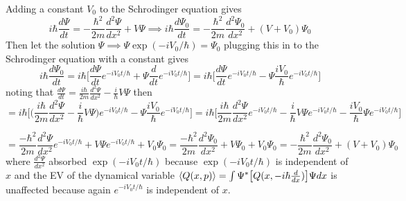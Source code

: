 \documentclass[12pt]{exam}
\begin{document}
\begin{solution}
    Adding a constant $V_0$ to the Schrodinger equation gives 
    $$i\hbar\frac{d\Psi}{dt} = -\frac{\hbar^2}{2m}\frac{d^2\Psi}{dx^2}+V\Psi \implies i\hbar\frac{d\Psi_0}{dt} = -\frac{\hbar^2}{2m}\frac{d^2\Psi_0}{dx^2}+(V+V_0)\Psi_0$$
    Then let the solution $\Psi \implies \Psi \exp(-iV_0/\hbar) = \Psi_0$ plugging this in to the Schrodinger equation with a constant gives
    $$i\hbar\frac{d\Psi_0}{dt}=i\hbar\bigg[\frac{d\Psi}{dt}e^{-iV_0t/\hbar} + \Psi \frac{d}{dt}e^{-iV_0t/\hbar}\bigg] = i\hbar\bigg[\frac{d\Psi}{dt}e^{-iV_0t/\hbar} - \Psi \frac{iV_0}{\hbar}e^{-iV_0t/\hbar}\bigg]$$
    noting that $\frac{d\Psi}{dt} = \frac{i\hbar}{2m}\frac{d^2\Psi}{dx^2} - \frac{i}{\hbar}V\Psi$ then 
    $$= i\hbar\bigg[\big(\frac{i\hbar}{2m}\frac{d^2\Psi}{dx^2} - \frac{i}{\hbar}V\Psi \big)e^{-iV_0t/\hbar} - \Psi \frac{iV_0}{\hbar}e^{-iV_0t/\hbar}\bigg]  = 
    i\hbar\bigg[\frac{i\hbar}{2m}\frac{d^2\Psi}{dx^2}e^{-iV_0t/\hbar} - \frac{i}{\hbar}V\Psi e^{-iV_0t/\hbar} -\frac{iV_0}{\hbar} \Psi e^{-iV_0t/\hbar}\bigg] $$

    $$= 
    \frac{-\hbar^2}{2m}\frac{d^2\Psi}{dx^2}e^{-iV_0t/\hbar} +V\Psi e^{-iV_0t/\hbar} +V_0 \Psi_0 =  \frac{-\hbar^2}{2m}\frac{d^2\Psi_0}{dx^2} +V\Psi_0 +V_0 \Psi_0 = -\frac{\hbar^2}{2m}\frac{d^2\Psi_0}{dx^2}+(V+V_0)\Psi_0$$
    where $\frac{d^2\Psi}{dx^2}$ absorbed $\exp(-iV_0t/\hbar)$ because $\exp(-iV_0t/\hbar)$ is independent of $x$ and the EV of the dynamical variable $\expval{Q(x,p)} = \int \Psi^* \big[Q(x,-i\hbar \frac{d}{dx})\big] \Psi dx$ is unaffected because again $e^{-iV_0t/\hbar}$ is  independent of $x$.
\end{solution}
\end{document}
